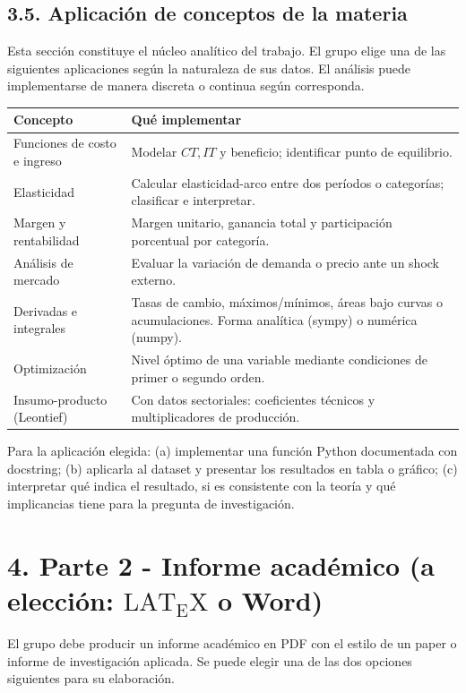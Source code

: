 \documentclass[10pt]{article}
\begin{document}
\subsection*{3.5. Aplicación de conceptos de la materia}
Esta sección constituye el núcleo analítico del trabajo. El grupo elige una de las siguientes aplicaciones según la naturaleza de sus datos. El análisis puede implementarse de manera discreta o continua según corresponda.

\begin{center}
\begin{tabular}{|l|l|}
\hline
Concepto & Qué implementar \\
\hline
Funciones de costo e ingreso & Modelar $C T, I T$ y beneficio; identificar punto de equilibrio. \\
\hline
Elasticidad & Calcular elasticidad-arco entre dos períodos o categorías; clasificar e interpretar. \\
\hline
Margen y rentabilidad & Margen unitario, ganancia total y participación porcentual por categoría. \\
\hline
Análisis de mercado & Evaluar la variación de demanda o precio ante un shock externo. \\
\hline
Derivadas e integrales & Tasas de cambio, máximos/mínimos, áreas bajo curvas o acumulaciones. Forma analítica (sympy) o numérica (numpy). \\
\hline
Optimización & Nivel óptimo de una variable mediante condiciones de primer o segundo orden. \\
\hline
Insumo-producto (Leontief) & Con datos sectoriales: coeficientes técnicos y multiplicadores de producción. \\
\hline
\end{tabular}
\end{center}

Para la aplicación elegida: (a) implementar una función Python documentada con docstring; (b) aplicarla al dataset y presentar los resultados en tabla o gráfico; (c) interpretar qué indica el resultado, si es consistente con la teoría y qué implicancias tiene para la pregunta de investigación.

\section*{4. Parte 2 - Informe académico (a elección: $\mathrm{LAT}_{\mathrm{E}} \mathrm{X}$ o Word)}
El grupo debe producir un informe académico en PDF con el estilo de un paper o informe de investigación aplicada. Se puede elegir una de las dos opciones siguientes para su elaboración.
\end{document}

